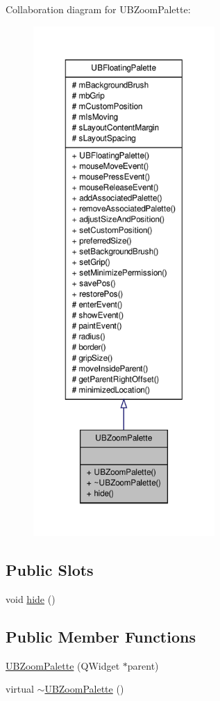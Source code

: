 Collaboration diagram for U\-B\-Zoom\-Palette\-:
\nopagebreak
\begin{figure}[H]
\begin{center}
\leavevmode
\includegraphics[height=550pt]{d9/dc0/class_u_b_zoom_palette__coll__graph}
\end{center}
\end{figure}
\subsection*{Public Slots}
\begin{DoxyCompactItemize}
\item 
void \hyperlink{class_u_b_zoom_palette_afc19e4c405b1ee8586431342ddce5112}{hide} ()
\end{DoxyCompactItemize}
\subsection*{Public Member Functions}
\begin{DoxyCompactItemize}
\item 
\hyperlink{class_u_b_zoom_palette_a7f74e9a8df1069509c0ae86bbfec0c57}{U\-B\-Zoom\-Palette} (Q\-Widget $\ast$parent)
\item 
virtual \hyperlink{class_u_b_zoom_palette_a695fefccf7d65338de6e25d3942bd77e}{$\sim$\-U\-B\-Zoom\-Palette} ()
\end{DoxyCompactItemize}
